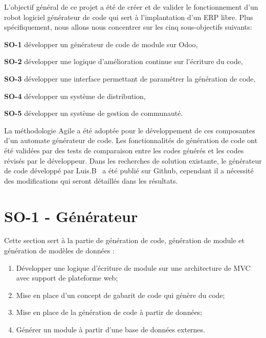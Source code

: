 \label{sec:Theme1} \label{chapitre_methode}

L’objectif général de ce projet a été de créer et de valider le fonctionnement d’un robot logiciel générateur de code qui sert à l’implantation d’un ERP libre. Plus spécifiquement, nous allons nous concentrer sur les cinq sous-objectifs suivants:

\textbf{SO-1} développer un générateur de code de module sur Odoo,

\textbf{SO-2} développer une logique d'amélioration continue sur l'écriture du code,

\textbf{SO-3} développer une interface permettant de paramétrer la génération de code,

\textbf{SO-4} développer un système de distribution,

\textbf{SO-5} développer un système de gestion de communauté.

La méthodologie Agile a été adoptée pour le développement de ces composantes d'un automate générateur de code. Les fonctionnalités de génération de code ont été validées par des tests de comparaison entre les codes générés et les codes révisés par le développeur. Dans les recherches de solution existante, le générateur de code développé par Luis.B~\cite{bluiksnot_repo} a été publié sur Github, cependant il a nécessité des modifications qui seront détaillés dans les résultats.


\section{SO-1 - Générateur}
Cette section sert à la partie de génération de code, génération de module et génération de modèles de données :
\begin{enumerate}
    \item Développer une logique d’écriture de module sur une architecture de MVC avec support de plateforme web;
    \item Mise en place d’un concept de gabarit de code qui génère du code;
    \item Mise en place de la génération de code à partir de données;
    \item Générer un module à partir d’une base de données externes.
\end{enumerate}

